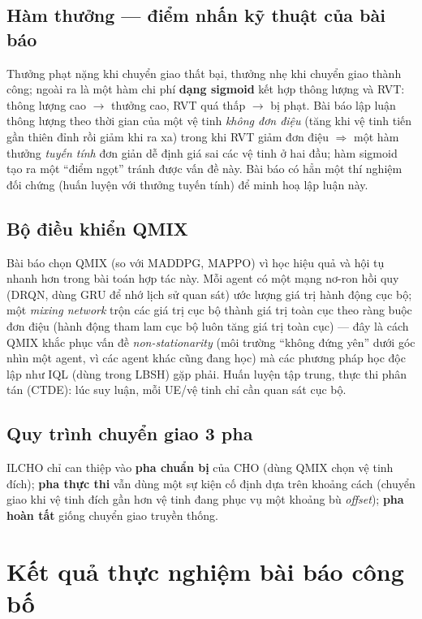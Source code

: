 \documentclass[12pt,a4paper]{article}
\begin{document}
\subsection{Hàm thưởng — điểm nhấn kỹ thuật của bài báo}

Thưởng phạt nặng khi chuyển giao thất bại, thưởng nhẹ khi chuyển giao thành công; ngoài ra là
một hàm chi phí \textbf{dạng sigmoid} kết hợp thông lượng và RVT: thông lượng cao $\to$ thưởng
cao, RVT quá thấp $\to$ bị phạt. Bài báo lập luận thông lượng theo thời gian của một vệ tinh
\emph{không đơn điệu} (tăng khi vệ tinh tiến gần thiên đỉnh rồi giảm khi ra xa) trong khi RVT
giảm đơn điệu $\Rightarrow$ một hàm thưởng \emph{tuyến tính} đơn giản dễ định giá sai các vệ
tinh ở hai đầu; hàm sigmoid tạo ra một ``điểm ngọt'' tránh được vấn đề này. Bài báo có hẳn một
thí nghiệm đối chứng (huấn luyện với thưởng tuyến tính) để minh hoạ lập luận này.

\subsection{Bộ điều khiển QMIX}

Bài báo chọn QMIX (so với MADDPG, MAPPO) vì học hiệu quả và hội tụ nhanh hơn trong bài toán
hợp tác này. Mỗi agent có một mạng nơ-ron hồi quy (DRQN, dùng GRU để nhớ lịch sử quan sát) ước
lượng giá trị hành động cục bộ; một \emph{mixing network} trộn các giá trị cục bộ thành giá
trị toàn cục theo ràng buộc đơn điệu (hành động tham lam cục bộ luôn tăng giá trị toàn cục) —
đây là cách QMIX khắc phục vấn đề \emph{non-stationarity} (môi trường ``không đứng yên'' dưới
góc nhìn một agent, vì các agent khác cũng đang học) mà các phương pháp học độc lập như IQL
(dùng trong LBSH) gặp phải. Huấn luyện tập trung, thực thi phân tán (CTDE): lúc suy luận, mỗi
UE/vệ tinh chỉ cần quan sát cục bộ.

\subsection{Quy trình chuyển giao 3 pha}

ILCHO chỉ can thiệp vào \textbf{pha chuẩn bị} của CHO (dùng QMIX chọn vệ tinh đích); \textbf{pha
thực thi} vẫn dùng một sự kiện cố định dựa trên khoảng cách (chuyển giao khi vệ tinh đích gần
hơn vệ tinh đang phục vụ một khoảng bù \emph{offset}); \textbf{pha hoàn tất} giống chuyển giao
truyền thống.

\section{Kết quả thực nghiệm bài báo công bố}
\end{document}
